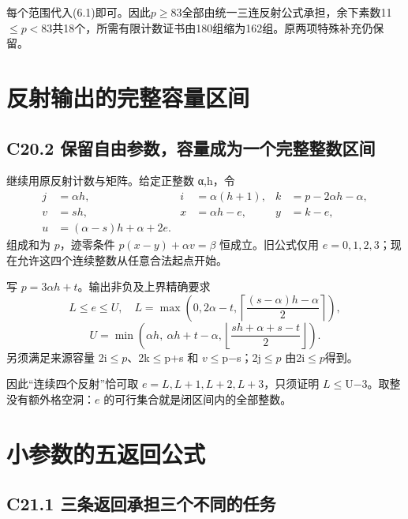 {每个范围代入(6.1)即可。因此\ensuremath{p}\ensuremath{\ge}83全部由统一三连反射公式承担，余下素数11\ensuremath{\le}\ensuremath{p<83}共18个，所需有限计数证书由180组缩为162组。原两项特殊补充仍保留。}


\section{反射输出的完整容量区间}\label{construct:capacity-interval}
\subsection*{\texorpdfstring{{C20.2} {保留自由参数，容量成为一个完整整数区间}}{C20.2 保留自由参数，容量成为一个完整整数区间}}\label{C20-h139}

{继续用原反射计数与矩阵。给定正整数} {α,h，令} \[
\begin{aligned}
j&=\alpha h,& i&=\alpha(h+1),& k&=p-2\alpha h-\alpha,\\
v&=sh,&x&=\alpha h-e,&y&=k-e,\\
u&=(\alpha-s)h+\alpha+2e.
\end{aligned}
\tag{C20.2.1}
\] {组成和为} {\ensuremath{p}，迹零条件} {\ensuremath{p(x-y)+\alpha v=\beta }} {恒成立。旧公式仅用} {\ensuremath{e=0,1,2,3}；现在允许这四个连续整数从任意合法起点开始。}

{写} {\ensuremath{p=3\alpha h+t}。输出非负及上界精确要求} \[
L\le e\le U,
\quad
L=\max\left(0,2\alpha-t,
\left\lceil\frac{(s-\alpha)h-\alpha}{2}\right\rceil\right),
\] \[
U=\min\left(\alpha h,\ \alpha h+t-\alpha,
\left\lfloor\frac{sh+\alpha+s-t}{2}\right\rfloor\right).
\tag{C20.2.2}
\] {另须满足来源容量} {2i\ensuremath{\le}\ensuremath{p}、2k\ensuremath{\le}p+s} {和} {\ensuremath{v}\ensuremath{\le}p−s；2j\ensuremath{\le}\ensuremath{p}} {由2i\ensuremath{\le}\ensuremath{p}得到。}

{因此``连续四个反射''恰可取} {\ensuremath{e=L,L+1,L+2,L+3}，只须证明} {\ensuremath{L}\ensuremath{\le}U−3。取整没有额外格空洞：\ensuremath{e}} {的可行集合就是闭区间内的全部整数。}


\section{小参数的五返回公式}\label{construct:five-returns}
\subsection*{\texorpdfstring{{C21.1} {三条返回承担三个不同的任务}}{C21.1 三条返回承担三个不同的任务}}\label{C21-h140}

